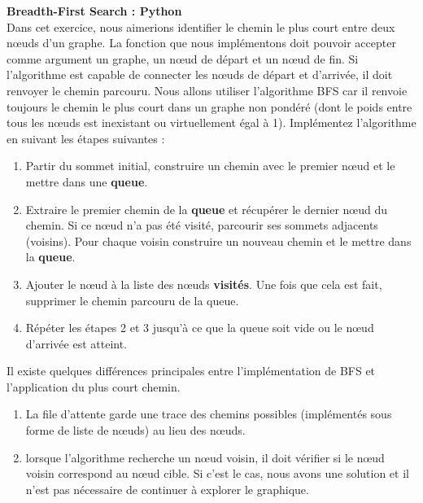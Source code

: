 \begin{Exercice}[15 minutes]\textbf{Breadth-First Search : Python
}\\
	Dans cet exercice, nous aimerions identifier le chemin le plus court entre deux nœuds d'un graphe.
	La fonction que nous implémentons doit pouvoir accepter comme argument un graphe, un nœud de départ et un nœud de fin. Si l'algorithme est capable de connecter les nœuds 			de départ et d'arrivée, il doit renvoyer le chemin parcouru. Nous allons utiliser l'algorithme BFS car il renvoie toujours le chemin le plus court dans un graphe non pondéré (dont le poids entre tous les nœuds est inexistant ou virtuellement égal à 1).
	    Implémentez l'algorithme en suivant les étapes suivantes :\\
	\begin{enumerate}
	    
		\item Partir du sommet initial, construire un chemin avec le premier nœud et le mettre dans une \textbf{queue}.
		\item Extraire le premier chemin de la \textbf{queue} et récupérer le dernier nœud du chemin. Si ce nœud n'a pas été visité, parcourir ses sommets adjacents (voisins). Pour chaque voisin construire un nouveau chemin et le mettre dans la \textbf{queue}.
		\item Ajouter le nœud à la liste des nœuds \textbf{visités}. Une fois que cela est fait, supprimer le chemin  parcouru de la queue.
		\item Répéter les étapes 2 et 3 jusqu'à ce que la queue soit vide ou le nœud d'arrivée est atteint.\\
	\end{enumerate}

	
    	\begin{conseil}
		Il existe quelques différences principales entre l'implémentation de BFS et  l'application du plus court chemin.
        		\begin{enumerate}
			\item La file d'attente garde une trace des chemins possibles (implémentés sous forme de liste de nœuds) au lieu des nœuds.
	           	\item lorsque l'algorithme recherche un nœud voisin, il doit vérifier si le nœud voisin correspond au nœud cible. Si c'est le cas, nous avons une solution et il n'est pas 					nécessaire de continuer à explorer le graphique.
        		\end{enumerate}

    	\end{conseil}

	\begin{solution}
		
	\end{solution}
\end{Exercice}

